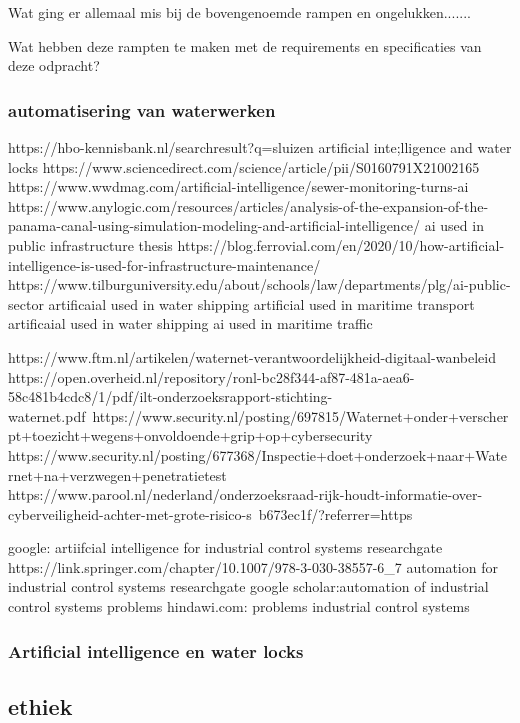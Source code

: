 Wat ging er allemaal mis bij de bovengenoemde rampen en ongelukken....... 

Wat hebben deze rampten te maken met de requirements en specificaties van deze odpracht? 


\subsubsection{automatisering van waterwerken}
https://hbo-kennisbank.nl/searchresult?q=sluizen 
artificial inte;lligence and water locks 
https://www.sciencedirect.com/science/article/pii/S0160791X21002165 
https://www.wwdmag.com/artificial-intelligence/sewer-monitoring-turns-ai 
https://www.anylogic.com/resources/articles/analysis-of-the-expansion-of-the-panama-canal-using-simulation-modeling-and-artificial-intelligence/ 
ai used in public infrastructure thesis 
https://blog.ferrovial.com/en/2020/10/how-artificial-intelligence-is-used-for-infrastructure-maintenance/ 
https://www.tilburguniversity.edu/about/schools/law/departments/plg/ai-public-sector 
artificaial used in water shipping 
artificial used in maritime transport 
artificaial used in water shipping 
ai used in maritime traffic 



https://www.ftm.nl/artikelen/waternet-verantwoordelijkheid-digitaal-wanbeleid 
https://open.overheid.nl/repository/ronl-bc28f344-af87-481a-aea6-58c481b4cdc8/1/pdf/ilt-onderzoeksrapport-stichting-waternet.pdf\ 
https://www.security.nl/posting/697815/Waternet+onder+verscherpt+toezicht+wegens+onvoldoende+grip+op+cybersecurity 
https://www.security.nl/posting/677368/Inspectie+doet+onderzoek+naar+Waternet+na+verzwegen+penetratietest 
https://www.parool.nl/nederland/onderzoeksraad-rijk-houdt-informatie-over-cyberveiligheid-achter-met-grote-risico-s~b673ec1f/?referrer=https%


google: artiifcial intelligence for industrial control systems researchgate 
https://link.springer.com/chapter/10.1007/978-3-030-38557-6_7 
automation  for industrial control systems 
researchgate 
google scholar:automation of industrial control systems problems 
hindawi.com: problems industrial control systems 

\subsubsection{Artificial intelligence en water locks}


\subsection{ethiek}


